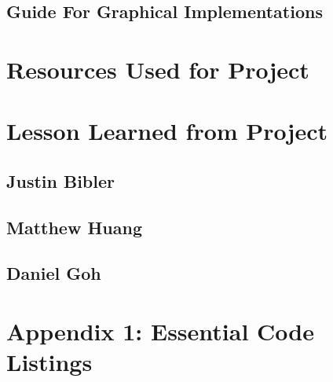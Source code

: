 \documentclass[10pt,journal,compsoc,draftclsnofoot]{IEEEtran}
\begin{document}
\begin{flushleft}
\subsection{Guide For Graphical Implementations}


\section{Resources Used for Project}



\section{Lesson Learned from Project}

\subsection{Justin Bibler}


\subsection{Matthew Huang}


\subsection{Daniel Goh}



\section{Appendix 1: Essential Code Listings}



\end{flushleft}
\end{document}
